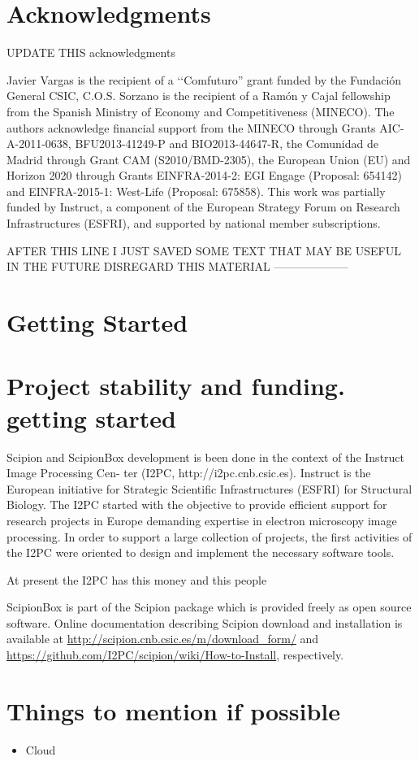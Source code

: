 \section{Acknowledgments}

UPDATE THIS acknowledgments

Javier Vargas is the recipient of a ‘‘Comfuturo” grant funded by
the Fundación General CSIC, C.O.S. Sorzano is the recipient of a
Ramón y Cajal fellowship from the Spanish Ministry of Economy
and Competitiveness (MINECO). The authors acknowledge financial
support from the MINECO through Grants AIC-A-2011-0638,
BFU2013-41249-P and BIO2013-44647-R, the Comunidad de
Madrid through Grant CAM (S2010/BMD-2305), the European
Union (EU) and Horizon 2020 through Grants EINFRA-2014-2:
EGI Engage (Proposal: 654142) and EINFRA-2015-1: West-Life
(Proposal: 675858).
This work was partially funded by Instruct, a component of the
European Strategy Forum on Research Infrastructures (ESFRI), and
supported by national member subscriptions.




    AFTER THIS LINE I JUST SAVED SOME TEXT THAT MAY BE USEFUL IN THE FUTURE DISREGARD THIS MATERIAL
   --------------------
   

\section{Getting Started}

\section{Project stability and funding. getting started}


Scipion and ScipionBox development is been done in the context of the Instruct Image Processing Cen-
ter (I2PC, http://i2pc.cnb.csic.es). Instruct is the European initiative for Strategic
Scientific Infrastructures (ESFRI) for Structural Biology. The I2PC started with the objective 
to provide efficient support for research projects in Europe demanding expertise in 
electron microscopy image processing. In order to support a large collection
of projects, the first activities of the I2PC were oriented to design and implement the
necessary software tools. 

At present the I2PC has this money and this people

ScipionBox is part of the Scipion package which is provided 
freely as open source software. Online documentation
describing Scipion download and installation is available
at \url{http://scipion.cnb.csic.es/m/download_form/} and \url{https://github.com/I2PC/scipion/wiki/How-to-Install}, respectively.

\section{Things to mention if possible}
\begin{itemize}
 \item Cloud
\end{itemize}
